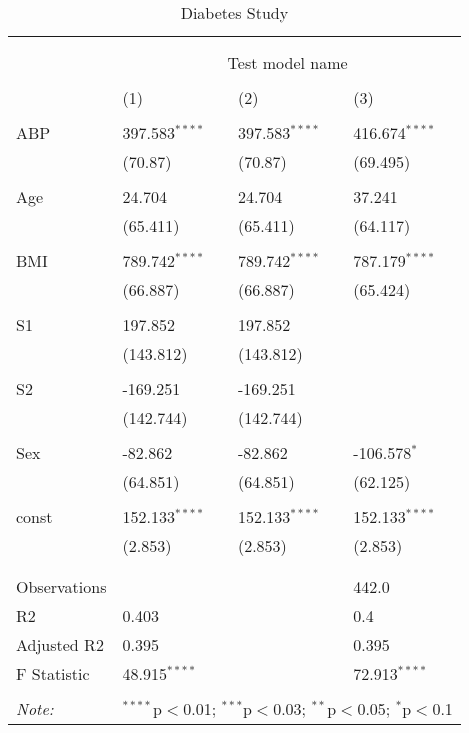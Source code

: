 \begin{table}[!htbp] \centering
  \caption{Diabetes Study}
  \label{}
\begin{tabularx}{\textwidth}{lXXX}
\\[-1.8ex]\hline
\hline \\[-1.8ex]
& \multicolumn{3}{c}{\textit{}} \
\cr \cline{3-4}
\\[-1.8ex] & \multicolumn{3}{c}{Test model name} \\\\[-1.8ex] & (1) & (2) & (3) \\
\hline \\[-1.8ex]
 ABP & 397.583$^{****}$ & 397.583$^{****}$ & 416.674$^{****}$ \\
  & (70.87) & (70.87) & (69.495) \\
  & & & \\
 Age & 24.704$^{}$ & 24.704$^{}$ & 37.241$^{}$ \\
  & (65.411) & (65.411) & (64.117) \\
  & & & \\
 BMI & 789.742$^{****}$ & 789.742$^{****}$ & 787.179$^{****}$ \\
  & (66.887) & (66.887) & (65.424) \\
  & & & \\
 S1 & 197.852$^{}$ & 197.852$^{}$ & \\
  & (143.812) & (143.812) & \\
  & & & \\
 S2 & -169.251$^{}$ & -169.251$^{}$ & \\
  & (142.744) & (142.744) & \\
  & & & \\
 Sex & -82.862$^{}$ & -82.862$^{}$ & -106.578$^{*}$ \\
  & (64.851) & (64.851) & (62.125) \\
  & & & \\
 const & 152.133$^{****}$ & 152.133$^{****}$ & 152.133$^{****}$ \\
  & (2.853) & (2.853) & (2.853) \\
  & & & \\
\hline \\[-1.8ex]
 Observations &   &   & 442.0 \\
 R${2}$ & 0.403 &   & 0.4 \\
 Adjusted R${2}$ & 0.395 &   & 0.395 \\
 F Statistic & 48.915$^{****}$  &     & 72.913$^{****}$  \\
\hline
\hline \\[-1.8ex]
\textit{Note:} & \multicolumn{3}{r}{$^{****}$p$<$0.01; $^{***}$p$<$0.03; $^{**}$p$<$0.05; $^{*}$p$<$0.1} \\
\end{tabularx}
\end{table}